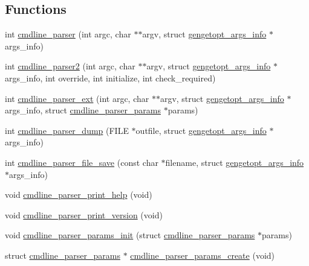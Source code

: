 \subsection*{Functions}
\begin{DoxyCompactItemize}
\item 
int \hyperlink{des-getopt_8h_a3c3df73307452c51fee0a34640d92196}{cmdline\+\_\+parser} (int argc, char $\ast$$\ast$argv, struct \hyperlink{structgengetopt__args__info}{gengetopt\+\_\+args\+\_\+info} $\ast$args\+\_\+info)
\item 
int \hyperlink{des-getopt_8h_a78a0cd581698415a62f68214603b1a30}{cmdline\+\_\+parser2} (int argc, char $\ast$$\ast$argv, struct \hyperlink{structgengetopt__args__info}{gengetopt\+\_\+args\+\_\+info} $\ast$args\+\_\+info, int override, int initialize, int check\+\_\+required)
\item 
int \hyperlink{des-getopt_8h_ac7bb5d76f3f56d1c0b3b531f11ac6f07}{cmdline\+\_\+parser\+\_\+ext} (int argc, char $\ast$$\ast$argv, struct \hyperlink{structgengetopt__args__info}{gengetopt\+\_\+args\+\_\+info} $\ast$args\+\_\+info, struct \hyperlink{structcmdline__parser__params}{cmdline\+\_\+parser\+\_\+params} $\ast$params)
\item 
int \hyperlink{des-getopt_8h_a1f73418092a6e6eb3706aa0de2785e11}{cmdline\+\_\+parser\+\_\+dump} (F\+I\+LE $\ast$outfile, struct \hyperlink{structgengetopt__args__info}{gengetopt\+\_\+args\+\_\+info} $\ast$args\+\_\+info)
\item 
int \hyperlink{des-getopt_8h_a5f3e9412f88f1058a31ac28ad2ea2818}{cmdline\+\_\+parser\+\_\+file\+\_\+save} (const char $\ast$filename, struct \hyperlink{structgengetopt__args__info}{gengetopt\+\_\+args\+\_\+info} $\ast$args\+\_\+info)
\item 
void \hyperlink{des-getopt_8h_ad4f7db2fa4002379eb30e5206f3b7492}{cmdline\+\_\+parser\+\_\+print\+\_\+help} (void)
\item 
void \hyperlink{des-getopt_8h_a96f27bf35ce0ab8eea7a1f6e6b59a5e2}{cmdline\+\_\+parser\+\_\+print\+\_\+version} (void)
\item 
void \hyperlink{des-getopt_8h_af72b814611cffc706b2135ccdfe7e997}{cmdline\+\_\+parser\+\_\+params\+\_\+init} (struct \hyperlink{structcmdline__parser__params}{cmdline\+\_\+parser\+\_\+params} $\ast$params)
\item 
struct \hyperlink{structcmdline__parser__params}{cmdline\+\_\+parser\+\_\+params} $\ast$ \hyperlink{des-getopt_8h_afd778af110fe0ee1ea5eac7aa9939d92}{cmdline\+\_\+parser\+\_\+params\+\_\+create} (void)
\item 
$$
\end{DoxyCompactItemize}
